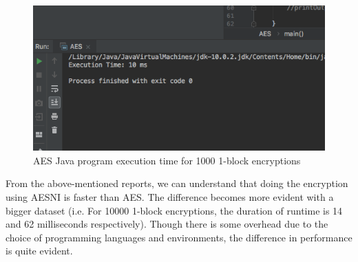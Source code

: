 \documentclass{article}
\begin{document}
\begin{figure}[h!]
\centering
\includegraphics[scale=0.5]{java_exe_time.png}
\caption{AES Java program execution time for 1000 1-block encryptions}
\label{fig:java_execution_time}
\end{figure}

From the above-mentioned reports, we can understand that doing the encryption using AESNI is faster than AES. The difference becomes more evident with a bigger dataset (i.e. For 10000 1-block encryptions, the duration of runtime is 14 and 62 milliseconds respectively). Though there is some overhead due to the choice of programming languages and environments, the difference in performance is quite evident.




\end{document}

